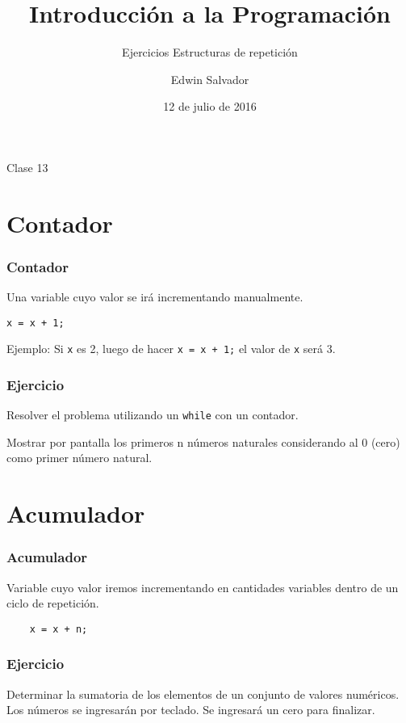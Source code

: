 \documentclass[handout]{beamer}
\title{Introducción a la Programación}
\subtitle{Ejercicios Estructuras de repetición}
\author{Edwin Salvador}
\date{12 de julio de 2016}
\begin{document}
  \begin{frame}
    \titlepage
    \centerline{Clase 13}
  \end{frame}
  

\section{Contador} %
\label{sec:contador}
\begin{frame}[fragile]\frametitle{Contador}
    
Una variable cuyo valor se irá incrementando manualmente.

\begin{lstlisting}
x = x + 1;    
\end{lstlisting}
Ejemplo: Si \texttt{x} es 2, luego de hacer \texttt{x = x + 1;} el valor de \texttt{x} será 3.

\end{frame}

\begin{frame}[t]\frametitle{Ejercicio}
    
Resolver el problema utilizando un \texttt{while} con un contador.

Mostrar por pantalla los primeros n números naturales considerando al 0 (cero) como primer número natural.

\end{frame}

\section{Acumulador} %
\label{sec:acumulador}
\begin{frame}[fragile]\frametitle{Acumulador}
    
Variable cuyo valor iremos incrementando en cantidades variables dentro de un ciclo de repetición. 
\begin{lstlisting}
    x = x + n;
\end{lstlisting}

\end{frame}

\begin{frame}[t]\frametitle{Ejercicio}
    
Determinar la sumatoria de los elementos de un conjunto de valores numéricos. Los números se ingresarán por teclado. Se ingresará un cero para  finalizar.


\end{frame}
\end{document}
